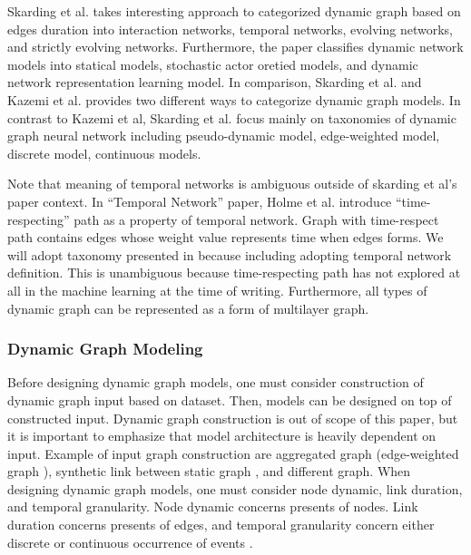 \documentclass{IEEEtran}
\begin{document}
Skarding et al. \cite{skardingFoundationsModelingDynamic2021} takes interesting approach to categorized dynamic graph based on edges duration into interaction networks, temporal networks, evolving networks, and strictly evolving networks. Furthermore, the paper classifies dynamic network models into statical models, stochastic actor oretied models, and dynamic network representation learning model. In comparison, Skarding et al. \cite{skardingFoundationsModelingDynamic2021} and Kazemi et al. \cite{kazemiRepresentationLearningDynamica} provides two different ways to categorize dynamic graph models. In contrast to Kazemi et al, Skarding et al. focus mainly on taxonomies of dynamic graph neural network including pseudo-dynamic model, edge-weighted model, discrete model, continuous models.

Note that meaning of temporal networks is ambiguous outside of skarding et al's paper \cite{skardingFoundationsModelingDynamic2021} context. In ``Temporal Network'' paper, Holme et al. \cite{holme2012temporal} introduce ``time-respecting'' path as a property of temporal network. Graph with time-respect path contains edges whose weight value represents time when edges forms. We will adopt taxonomy presented in \cite{skardingFoundationsModelingDynamic2021} because including adopting temporal network definition. This is unambiguous because time-respecting path has not explored at all in the machine learning at the time of writing. Furthermore, all types of dynamic graph can be represented as a form of multilayer graph. \cite{kivela2014multilayer}

\subsubsection{Dynamic Graph Modeling}
\label{sec:org8492ce6}
Before designing dynamic graph models, one must consider construction of dynamic graph input based on dataset. Then, models can be designed on top of constructed input. Dynamic graph construction is out of scope of this paper, but it is important to emphasize that model architecture is heavily dependent on input. Example of input graph construction are aggregated graph (edge-weighted graph \cite{qu2020continuous}), synthetic link between static graph \cite{kapoor2020examining}, and different graph. When designing dynamic graph models, one must consider node dynamic, link duration, and temporal granularity. Node dynamic concerns presents of nodes. Link duration concerns presents of edges, and temporal granularity concern either discrete or continuous occurrence of events \cite{kazemiRepresentationLearningDynamica}.
\end{document}
